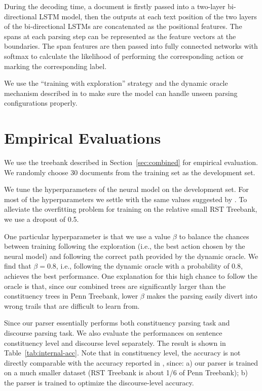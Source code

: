 \documentclass[11pt,letterpaper]{article}
\begin{document}
During the decoding time, 
a document is firstly passed into a two-layer bi-directional LSTM
model, then the outputs at each text position of the two layers of the bi-directional
LSTMs are concatenated as the positional features.
The spans at each parsing step can be represented as the feature vectors at the boundaries.
The span features are then passed into fully connected networks with softmax to calculate the 
likelihood of performing the corresponding action or marking the corresponding label.

We use the ``training with exploration'' strategy \cite{goldberg2013training}
and the dynamic oracle mechanism described in 
to make sure the model can handle unseen parsing configurations properly.


 
\section{Empirical Evaluations}\label{sec:exps}


We use the treebank described in Section~\ref{sec:combined}
for empirical evaluation.
We randomly choose 30 documents from the training set as the development set.


We tune the hyperparameters of the neural model on the development set.
For most of the hyperparameters we settle with the same values
suggested by .
To alleviate the overfitting problem for training on the relative small
RST Treebank, we use a dropout of 0.5.

One particular hyperparameter is that we use a value $\beta$ to
balance the chances between training following the exploration (i.e., the best action
chosen by the neural model)
and following the correct path provided by the dynamic oracle.
We find that $\beta=0.8$, i.e., following the dynamic oracle
with a probability of 0.8, achieves the best performance.
One explanation for this high chance to follow the oracle is that, since our combined trees are significantly larger 
than the constituency trees in Penn Treebank,
lower $\beta$ makes the parsing easily divert into wrong trails that are difficult to learn from.

Since our parser essentially performs both constituency parsing task and discourse parsing task.
We also evaluate the performances on sentence constituency level and
discourse level separately. The result is shown in Table~\ref{tab:internal-acc}.
Note that in constituency level, the accuracy is not directly comparable with the accuracy
reported in , since:
a) our parser is trained on a much smaller dataset (RST Treebank
is about 1/6 of Penn Treebank); b) the parser is trained to optimize
the discourse-level accuracy.
\end{document}
